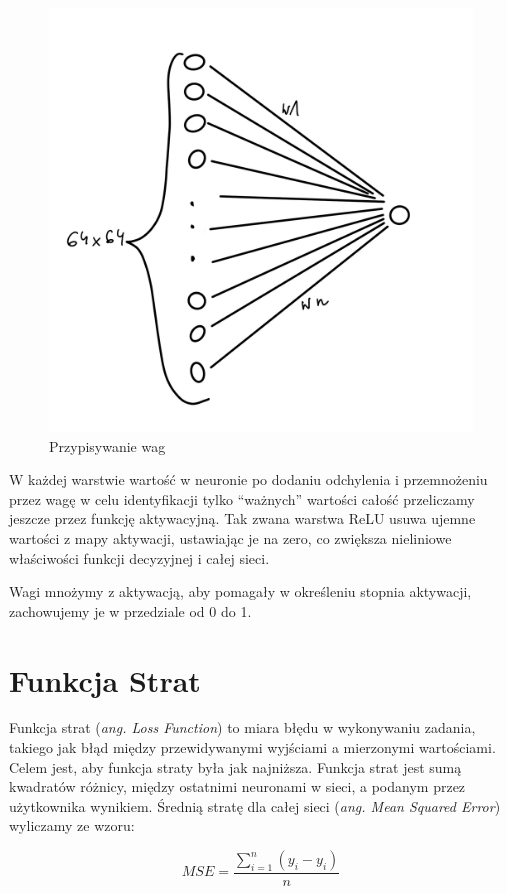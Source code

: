 \documentclass[brudnopis]{xmgr}
\begin{document}
\begin{figure}[!tbh]
\centering
\includegraphics[width=.8\hsize]{fig/3}
\caption{Przypisywanie wag\label{RYS.3}}
\end{figure}



W każdej warstwie  wartość w neuronie po dodaniu odchylenia i przemnożeniu przez wagę w celu identyfikacji tylko “ważnych” wartości całość przeliczamy jeszcze przez funkcję aktywacyjną. 
Tak zwana warstwa ReLU usuwa ujemne wartości z mapy aktywacji, ustawiając je na zero, co zwiększa nieliniowe właściwości funkcji decyzyjnej i całej sieci.


 Wagi mnożymy z aktywacją, aby pomagały w określeniu stopnia aktywacji, zachowujemy je w przedziale od 0 do 1.
 
 \section{Funkcja Strat \label{s:dsssl}}
 
Funkcja strat (\textit{ang. Loss Function}) to miara błędu w wykonywaniu zadania, takiego jak błąd między przewidywanymi wyjściami a mierzonymi wartościami. Celem jest, aby funkcja straty była jak najniższa. 
Funkcja strat jest sumą kwadratów różnicy, między ostatnimi neuronami w sieci, a podanym przez użytkownika wynikiem. Średnią stratę dla całej sieci (\textit{ang. Mean Squared Error}) wyliczamy ze wzoru:  

$$MSE=\frac{\sum_{i=1}^{n} (y_i - y_i)}{n}$$
\end{document}
